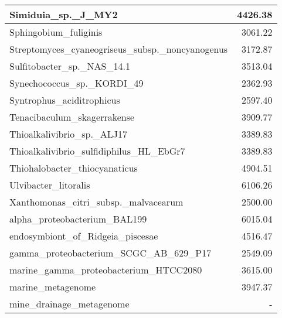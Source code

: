 \documentclass[12pt,a4paper]{article}
\begin{document}
\begin{table}[ht]
\begin{center}
\begin{tabular}{|l*{1}{|r}|}
Simiduia\_sp.\_J\_MY2 & 4426.38 \\ \hline
Sphingobium\_fuliginis & 3061.22 \\ \hline
Streptomyces\_cyaneogriseus\_subsp.\_noncyanogenus & 3172.87 \\ \hline
Sulfitobacter\_sp.\_NAS\_14.1 & 3513.04 \\ \hline
Synechococcus\_sp.\_KORDI\_49 & 2362.93 \\ \hline
Syntrophus\_aciditrophicus & 2597.40 \\ \hline
Tenacibaculum\_skagerrakense & 3909.77 \\ \hline
Thioalkalivibrio\_sp.\_ALJ17 & 3389.83 \\ \hline
Thioalkalivibrio\_sulfidiphilus\_HL\_EbGr7 & 3389.83 \\ \hline
Thiohalobacter\_thiocyanaticus & 4904.51 \\ \hline
Ulvibacter\_litoralis & 6106.26 \\ \hline
Xanthomonas\_citri\_subsp.\_malvacearum & 2500.00 \\ \hline
alpha\_proteobacterium\_BAL199 & 6015.04 \\ \hline
endosymbiont\_of\_Ridgeia\_piscesae & 4516.47 \\ \hline
gamma\_proteobacterium\_SCGC\_AB\_629\_P17 & 2549.09 \\ \hline
marine\_gamma\_proteobacterium\_HTCC2080 & 3615.00 \\ \hline
marine\_metagenome & 3947.37 \\ \hline
mine\_drainage\_metagenome & - \\ \hline
\end{tabular}
\end{center}
\end{table}
\end{document}
